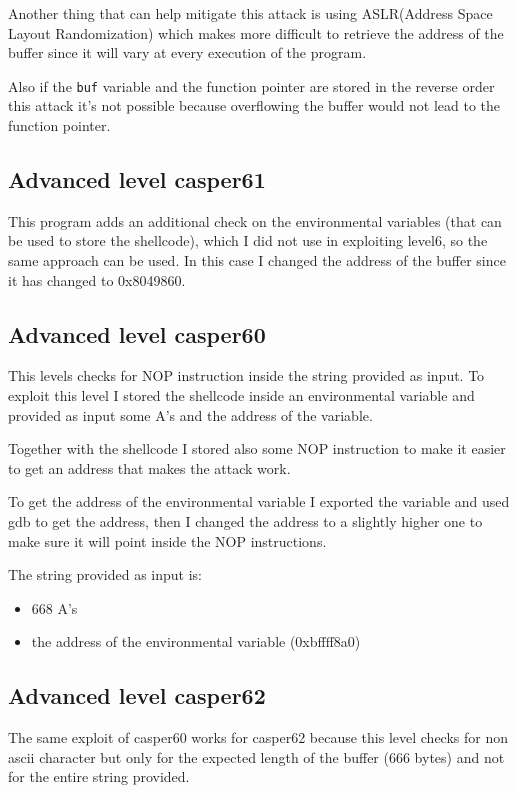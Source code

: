 \documentclass[a4paper,12pt]{article}
\begin{document}
Another thing that can help mitigate this attack is using ASLR(Address Space Layout Randomization)
which makes more difficult to retrieve the address of the buffer since it will vary at every execution of the program.

Also if the \texttt{buf} variable and the function pointer are stored in the reverse order this attack it's not possible because overflowing the buffer would not lead to the function pointer.

\subsection{Advanced level casper61}

This program adds an additional check on the environmental variables (that can be used to store the shellcode), which I did not use in exploiting level6, so the same approach can be used. In this case I changed the address of the buffer since it has changed to 0x8049860.

\subsection{Advanced level casper60}

This levels checks for NOP instruction inside the string provided as input. To exploit this level I stored the shellcode inside an environmental variable and provided as input some A's and the address of the variable.

Together with the shellcode I stored also some NOP instruction to make it easier to get an address that makes the attack work.

To get the address of the environmental variable I exported the variable and used gdb to get the address, then I changed the address to a slightly higher one to make sure it will point inside the NOP instructions.

The string provided as input is:
\begin{itemize}
\item 668 A's
\item the address of the environmental variable (0xbffff8a0)
\end{itemize}

\subsection{Advanced level casper62}

The same exploit of casper60 works for casper62 because this level checks for non ascii character but only for the expected length of the buffer (666 bytes) and not for the entire string provided.
\end{document}
